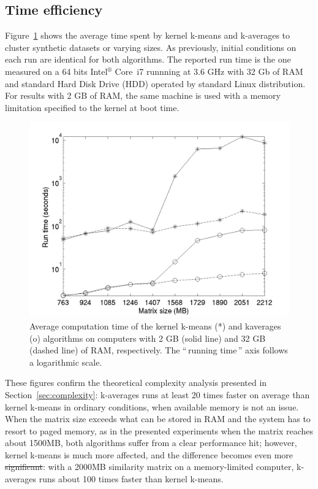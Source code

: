 \documentclass[natbib,smallextended]{svjour3}
\newcommand{\gl}[1]{``\,#1\,''} %
\providecommand{\DIFaddtex}[1]{{\protect\color{blue}\uwave{#1}}} %
\providecommand{\DIFdeltex}[1]{{\protect\color{red}\sout{#1}}}                      %
\providecommand{\DIFaddbegin}{} %
\providecommand{\DIFaddend}{} %
\providecommand{\DIFdelbegin}{} %
\providecommand{\DIFdelend}{} %
\providecommand{\DIFadd}[1]{\texorpdfstring{\DIFaddtex{#1}}{#1}} %
\providecommand{\DIFdel}[1]{\texorpdfstring{\DIFdeltex{#1}}{}} %
\newcommand{\DIFscaledelfig}{0.5}
\newlength{\DIFdelgraphicswidth} %
\newlength{\DIFdelgraphicsheight} %
\newcommand{\DIFaddincludegraphics}[2][]{{\color{blue}\fbox{\DIFOincludegraphics[#1]{#2}}}} %
\newcommand{\DIFdelincludegraphics}[2][]{%
\sbox{\DIFdelgraphicsbox}{\DIFOincludegraphics[#1]{#2}}%
\settoboxwidth{\DIFdelgraphicswidth}{\DIFdelgraphicsbox} %
\settoboxtotalheight{\DIFdelgraphicsheight}{\DIFdelgraphicsbox} %
\scalebox{\DIFscaledelfig}{%
\parbox[b]{\DIFdelgraphicswidth}{\usebox{\DIFdelgraphicsbox}\\[-\baselineskip] \rule{\DIFdelgraphicswidth}{0em}}\llap{\resizebox{\DIFdelgraphicswidth}{\DIFdelgraphicsheight}{%
\setlength{\unitlength}{\DIFdelgraphicswidth}%
\begin{picture}(1,1)%
\thicklines\linethickness{2pt} %
{\color[rgb]{1,0,0}\put(0,0){\framebox(1,1){}}}%
{\color[rgb]{1,0,0}\put(0,0){\line( 1,1){1}}}%
{\color[rgb]{1,0,0}\put(0,1){\line(1,-1){1}}}%
\end{picture}%
}\hspace*{3pt}}} %
} %
\DeclareRobustCommand{\DIFaddbegin}{\DIFOaddbegin \let\includegraphics\DIFaddincludegraphics} %
\DeclareRobustCommand{\DIFaddend}{\DIFOaddend \let\includegraphics\DIFOincludegraphics} %
\DeclareRobustCommand{\DIFdelbegin}{\DIFOdelbegin \let\includegraphics\DIFdelincludegraphics} %
\DeclareRobustCommand{\DIFdelend}{\DIFOaddend \let\includegraphics\DIFOincludegraphics} %
\begin{document}
\subsection{Time efficiency}

Figure~\ref{fig:timing} shows the average time spent by kernel k-means and k-averages to cluster synthetic datasets or varying sizes. As previously, initial conditions on each run are identical for both algorithms. The reported run time is the one measured on a 64 bits Intel$^\circledR$ Core\texttrademark   \, i7 runnning at 3.6 GHz with 32 Gb of RAM and standard Hard Disk Drive (HDD)  operated by standard Linux distribution. For results with 2 GB of RAM, the same machine is used with a memory limitation specified to the kernel at boot time.

\begin{figure}
\center
\includegraphics[width= .7\textwidth]{figures/simpleSwap.png}
\caption{Average computation time of the kernel k-means (*) and kaverages (o) algorithms on computers with 2 GB (solid line) and 32 GB (dashed line) of RAM, respectively. The \gl{running time} axis follows a logarithmic scale.}
\label{fig:timing}
\end{figure}

These figures confirm the theoretical complexity analysis presented in Section~\ref{sec:complexity}: k-averages runs at least 20 times faster on average than kernel k-means in ordinary conditions, when  available memory is not an issue. When the matrix size exceeds what can be stored in RAM and the system has to resort to paged memory, as in the presented experiments when the matrix reaches about 1500MB, both algorithms suffer from a clear performance hit; however, kernel k-means is much more affected, and the difference becomes even more \DIFdelbegin \DIFdel{significant}\DIFdelend \DIFaddbegin \DIFadd{important}\DIFaddend : with a 2000MB similarity matrix on a memory-limited computer, k-averages runs about 100 times faster than kernel k-means.
\end{document}
